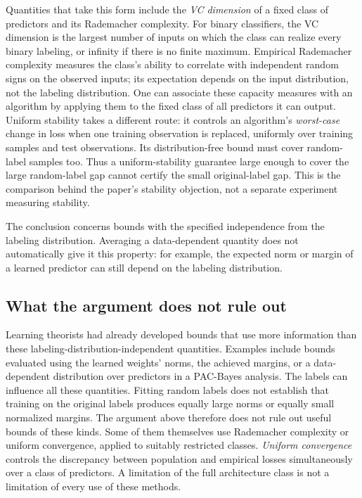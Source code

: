 \documentclass[11pt,twoside]{article}
\theoremstyle{definition}
\theoremstyle{remark}
\begin{document}
Quantities that take this form include the \emph{VC dimension} of a fixed class
of predictors and its Rademacher complexity. For binary classifiers, the VC
dimension is the largest number of inputs on which the class can realize
every binary labeling, or infinity if there is no finite maximum.
Empirical Rademacher complexity
measures the class's ability to correlate with independent random signs on
the observed inputs; its expectation depends on the input distribution,
not the labeling distribution. One can associate these capacity measures
with an algorithm by applying them to the fixed class of all predictors it
can output. Uniform stability takes a different route: it controls an
algorithm's \emph{worst-case} change in loss when one training observation is
replaced, uniformly over training samples and test observations. Its
distribution-free bound must cover random-label samples too. Thus a
uniform-stability guarantee large enough to cover the large random-label
gap cannot certify the small original-label gap. This is the comparison
behind the paper's stability objection, not a separate experiment measuring
stability.

The conclusion concerns bounds with the specified independence from the
labeling distribution. Averaging a data-dependent quantity does not
automatically give it this property: for example, the expected norm or
margin of a learned predictor can still depend on the labeling distribution.

\subsection{What the argument does not rule out}

Learning theorists had already developed bounds that use more information
than these labeling-distribution-independent quantities. Examples include
bounds evaluated using the learned weights' norms, the achieved margins,
or a data-dependent distribution over predictors in a PAC-Bayes analysis.
The labels can influence all these quantities. Fitting random labels does
not establish that training on the original labels produces equally large
norms or equally small normalized margins. The argument above therefore
does not rule out useful bounds of these kinds. Some of them themselves
use Rademacher complexity or uniform convergence, applied to suitably
restricted classes. \emph{Uniform convergence} controls the discrepancy
between population and empirical losses simultaneously over a class of
predictors. A limitation of the full architecture class is not a
limitation of every use of these methods.
\end{document}
